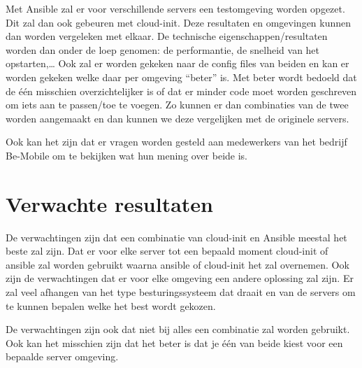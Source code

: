 Met Ansible zal er voor verschillende servers een testomgeving worden opgezet. Dit zal dan ook gebeuren met cloud-init. Deze resultaten en omgevingen kunnen dan worden  vergeleken met elkaar. De technische eigenschappen/resultaten worden dan onder de loep genomen: de performantie, de snelheid van het opstarten,… Ook zal er worden gekeken naar de config files van beiden en kan er worden gekeken welke daar per omgeving “beter” is. Met beter wordt bedoeld dat de één misschien overzichtelijker is of dat er minder code moet worden geschreven om iets aan te passen/toe te voegen. Zo kunnen er dan combinaties van de twee worden aangemaakt en dan kunnen we deze vergelijken met de originele servers. 

Ook kan het zijn dat er vragen worden gesteld aan medewerkers van het bedrijf Be-Mobile om te bekijken wat hun mening over beide is.


\section{Verwachte resultaten}
\label{sec:verwachte_resultaten}
De verwachtingen zijn dat een combinatie van cloud-init en Ansible meestal het beste zal zijn. Dat er voor elke server tot een bepaald moment cloud-init of ansible  zal worden gebruikt waarna ansible of cloud-init het zal overnemen. Ook zijn de verwachtingen dat er voor elke omgeving een andere oplossing zal zijn. Er zal veel afhangen van het type besturingssysteem dat draait en van de servers om te kunnen bepalen welke het best wordt gekozen. 

De verwachtingen zijn ook dat niet bij alles een combinatie zal worden gebruikt. Ook kan het misschien zijn dat het beter is dat je één van beide kiest voor een bepaalde server omgeving.



